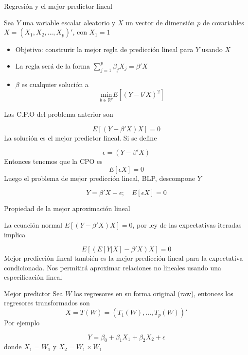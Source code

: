 \documentclass[aspectratio=169,xcolor=dvipsnames]{beamer}
\begin{document}
    \begin{frame}{Regresión y el mejor predictor lineal}

    Sea $Y$ una variable escalar aleatorio y $X$ un vector de dimensión $p$ de covariables $X=(X_1,X_2,...,X_p)'$, con $X_1=1$

    \begin{itemize}
        \item Objetivo: construrir la mejor regla de predicción lineal para $Y$ usando $X$
        \item La regla será de la forma $\sum_{j=1}^p\beta_jX_j=\beta 'X$
        \item $\beta$ es cualquier solución a 
        \begin{equation*}
            \underset{b\in \mathbb{R}^p}{\mathrm{min}}E[(Y-b'X)^2]
        \end{equation*}
    \end{itemize}
        
    \end{frame}
\begin{frame}
Las C.P.O del problema anterior son

\begin{equation*}
    E[(Y-\beta'X)X]=0
\end{equation*}
La solución es el mejor predictor lineal. Si se define

\begin{equation*}
    \epsilon=(Y-\beta'X)
\end{equation*}
Entonces tenemos que la CPO es
\begin{equation*}
 E[\epsilon X]=0   
\end{equation*}
Luego el problema de mejor predicción lineal, BLP, descompone $Y$

\begin{equation*}
    Y=\beta'X+\epsilon; \quad E[\epsilon X]=0
\end{equation*}
\end{frame}
\begin{frame}{Propiedad de la mejor aproximación lineal}

La ecuación normal $ E[(Y-\beta'X)X]=0$, por ley de las expectativas iteradas
implica

\begin{equation*}
    E[(E[Y|X]-\beta 'X)X]=0
\end{equation*}
Mejor predicción lineal también es la mejor predicción lineal para la expectativa condicionada. Nos permitirá aproximar relaciones no lineales usando una especificación lineal
\end{frame}
\begin{frame}{Mejor predictor}
Sea $W$ los regresores en su forma original (raw), entonces los regresores transformados son
\begin{equation*}
X=T(W)=(T_1(W),...,T_p(W))'    
\end{equation*}
Por ejemplo

\begin{equation*}
    Y=\beta_0+\beta_1X_1+\beta_2X_2+\epsilon
\end{equation*}
donde $X_1=W_1$ y $X_2=W_1\times W_1$    
\end{frame}
\end{document}
